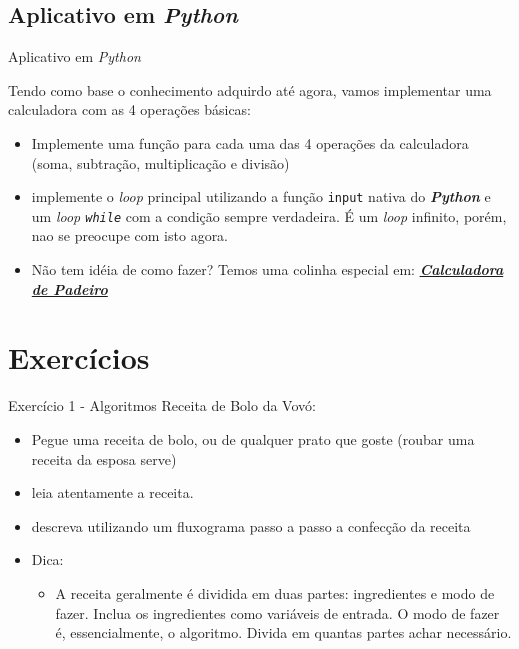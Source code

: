 \documentclass{beamer}
\begin{document}
\subsection{Aplicativo em \textit{Python}}

\begin{frame}{Aplicativo em \textit{Python}}

	Tendo como base o conhecimento adquirdo até agora, vamos implementar uma calculadora com as 4 operações básicas:
	\begin{itemize}
		\item Implemente uma função para cada uma das 4 operações da calculadora (soma, subtração, multiplicação e divisão)
		\item implemente o \textit{loop} principal utilizando a função \texttt{input} nativa do \textbf{\textit{Python}} e um \textit{loop \texttt{while}} com a condição sempre verdadeira. É um \textit{loop} infinito, porém, nao se preocupe com isto agora.
		\item Não tem idéia de como fazer? Temos uma colinha especial em: \href{MaoNaMassa/Modulo_01/calculadora.py}{\textbf{\textit{Calculadora de Padeiro}}}
	\end{itemize}

\end{frame}

\section{Exercícios}

\begin{frame}{Exercício 1 - Algoritmos}
Receita de Bolo da Vovó:
	\begin{itemize}
		\item Pegue uma receita de bolo, ou de qualquer prato que goste (roubar uma receita da esposa serve)
		\item leia atentamente a receita.
		\item descreva utilizando um fluxograma passo a passo a confecção da receita
		\item Dica:
		\begin{itemize}
			\item A receita geralmente é dividida em duas partes: ingredientes e modo de fazer. Inclua os ingredientes como variáveis de entrada. O modo de fazer é, essencialmente, o algoritmo. Divida em quantas partes achar necessário.
		\end{itemize}
	\end{itemize}
\end{frame}
\end{document}
